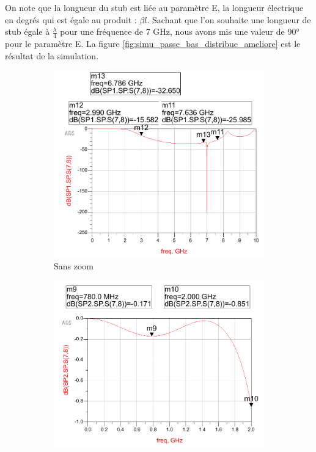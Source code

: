 \documentclass[french]{article}
\begin{document}
On note que la longueur du stub est liée au paramètre E, la longueur électrique en degrés qui est égale au produit : $\beta l$. Sachant que l'on souhaite une longueur de stub égale à $\frac{\lambda}{4}$ pour une fréquence de 7 GHz, nous avons mis une valeur de 90° pour le paramètre E. La figure \ref{fig:simu_passe_bas_distribue_ameliore} est le résultat de la simulation.

\begin{figure}[H]
	\centering
	\begin{subfigure}[b]{0.49\textwidth}
		\includegraphics[width=\textwidth]{photo/passe_bas_vic/simu_passe_bas_distribue_ameliore.PNG}
		\caption{Sans zoom}
		\label{fig:simu_passe_bas_distribue_amelioreG}
	\end{subfigure}
	\begin{subfigure}[b]{0.49\textwidth}
		\includegraphics[width=\textwidth]{photo/passe_bas_vic/simu_zoom_passe_bas_distribue_ameliore.PNG}

\end{subfigure}
\end{figure}
\end{document}
